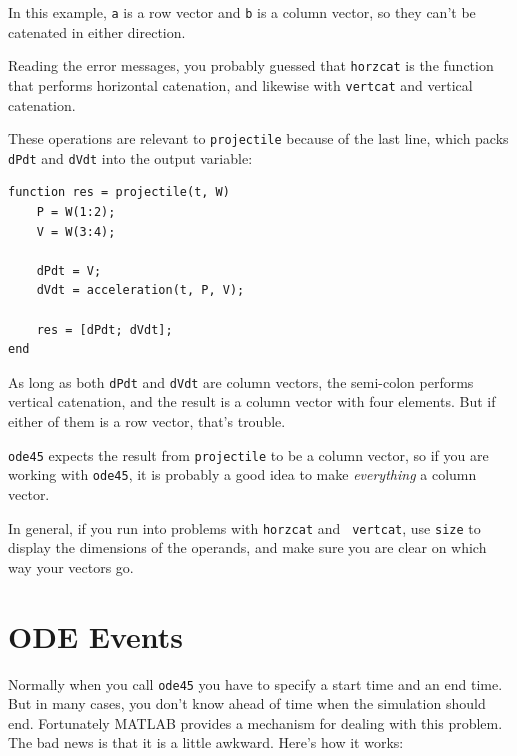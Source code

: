 \documentclass{book}
\begin{document}
In this example, {\tt a} is a row vector and {\tt b} is a column
vector, so they can't be catenated in either direction.

Reading the error messages, you probably guessed that {\tt horzcat}
is the function that performs horizontal catenation, and likewise
with {\tt vertcat} and vertical catenation.

These operations are relevant to {\tt projectile} because of the
last line, which packs {\tt dPdt} and {\tt dVdt} into the
output variable:

\begin{verbatim}
function res = projectile(t, W)
    P = W(1:2);
    V = W(3:4);

    dPdt = V;
    dVdt = acceleration(t, P, V);

    res = [dPdt; dVdt];
end
\end{verbatim}

As long as both {\tt dPdt} and {\tt dVdt} are column vectors,
the semi-colon performs vertical catenation, and the result is
a column vector with four elements.  But if either of them is a
row vector, that's trouble.

{\tt ode45} expects the result from {\tt projectile} to be a
column vector, so if you are working with {\tt ode45}, it is
probably a good idea to make {\em everything} a column vector.

In general, if you run into problems with {\tt horzcat} and {\tt
vertcat}, use {\tt size} to display the dimensions of the operands,
and make sure you are clear on which way your vectors go.


\section{ODE Events}
\label{events}

Normally when you call {\tt ode45} you have to specify
a start time and an end time.  But in many cases, you don't know ahead
of time when the simulation should end.
Fortunately MATLAB provides a mechanism for dealing
with this problem.  The bad news is that it is a little awkward.
Here's how it works:
\end{document}
